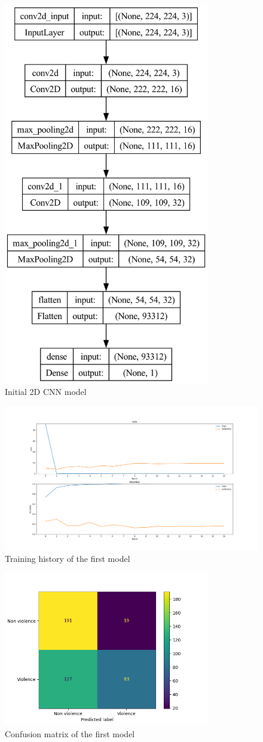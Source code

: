 \begin{figure}[]
    \centering
    \includegraphics[width=0.8\textwidth, height=0.6\textwidth, keepaspectratio]{images/simple3.png}
    \caption{Initial 2D CNN model}
    \label{fig:First2DCNN}
\end{figure}

\begin{figure}[]
    \centering
    \includegraphics[width=1\textwidth]{images/731a-simple3-b538-history.png}
    \caption{Training history of the first model}
    \label{fig:First2DCNNHistory}
\end{figure}

\begin{figure}[]
    \centering
    \includegraphics[width=0.8\textwidth]{images/731a-simple3-b538-conf_matrix.png}
    \caption{Confusion matrix of the first model}
    \label{fig:First2DCNNConfusionMatrix}
\end{figure}


